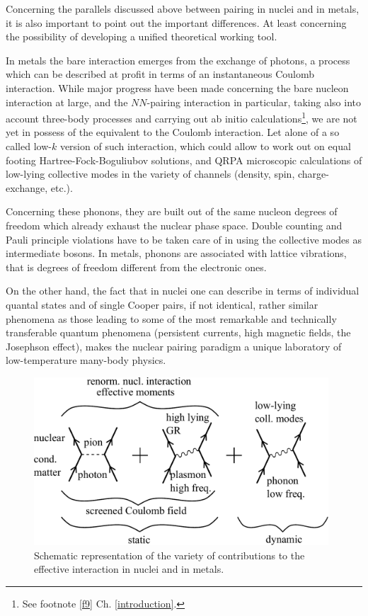 Concerning the parallels discussed above between pairing in nuclei and in metals, it is also important to point  out the important differences. At least concerning the possibility of developing a unified theoretical working tool. 

In metals the bare interaction emerges from the exchange of photons, a process which can be described at profit in terms of an instantaneous Coulomb interaction. While major progress have been made concerning the bare nucleon interaction at large, and the $NN$-pairing interaction in particular, taking also into account three-body processes and carrying out ab initio calculations\footnote{See footnote \ref{f9} Ch. \ref{introduction}.}, we are not yet in possess of the equivalent to the Coulomb interaction.  Let alone of a so called low-$k$ version of such interaction, which could allow to work out on equal footing Hartree-Fock-Boguliubov solutions, and QRPA microscopic calculations of low-lying collective modes in the variety of channels (density, spin, charge-exchange, etc.).

Concerning these phonons, they are built out of the same nucleon degrees of freedom which already exhaust the nuclear phase space. Double counting and Pauli principle violations have to be taken care of in using the collective modes as intermediate bosons. In metals, phonons are associated with lattice vibrations, that is degrees of freedom different from the electronic ones.

On the other hand, the fact that in nuclei one can describe in terms of individual quantal states and of single Cooper pairs, if not identical, rather similar phenomena as those leading to some of the most remarkable and technically transferable quantum phenomena (persistent currents, high magnetic fields, the Josephson effect), makes the nuclear pairing paradigm a unique laboratory of low-temperature many-body physics. 
   \begin{figure}
   	\centerline{\includegraphics*[width=11cm,angle=0	]{nutshell/figs/fig3A4}}
   	\caption{Schematic representation of the variety of contributions to the effective interaction in nuclei and in metals.}\label{fig3.A.4}
   \end{figure}

